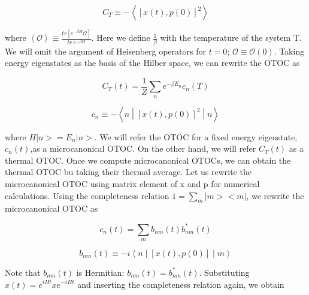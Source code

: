 \documentclass[12pt, letterpaper]{article}
\newcommand*{\1}{\hspace{1pt}}
\begin{document}
        \begin{equation}
            C_{T} \equiv  - \left\langle\left[x(t),p(0)\right]^{2}\right\rangle
        \end{equation}

        where $\left\langle \mathcal{O} \right\rangle \equiv \frac{tr\left[e^{-\beta H }\mathcal{O}\right]}{tr \ e^{-\beta H}}$. Here we define $\frac{1}{\beta}$ with 
        the temperature of the system T. We will omit the argument of Heisenberg operators for $t=0$; $\mathcal{O} \equiv \mathcal{O}(0)$. Taking energy eigenstates as 
        the basis of the Hilber space, we can rewrite the OTOC as 

        \begin{equation}
            C_{T}(t) = \frac{1}{Z} \sum _{n} e^{-\beta E_{n}} c_{n}(T)
        \end{equation}

        \begin{equation}
            c_{n} \equiv -\left\langle n \middle|\left[x(t),p(0)\right]^{2}\middle| n\right\rangle
        \end{equation}

        where $H|n>=E_{n}|n>$. We will refer the OTOC for a fixed energy eigenstate, $c_{n}(t)$,as a microcanonical OTOC. On the other hand, we will refer $C_{T}(t)$ as a
        thermal OTOC. Once we compute microcanonical OTOCs, we can obtain the thermal OTOC bu taking their thermal average. Let us rewrite the microcanonical OTOC using 
        matrix element of x and p for numerical calculations. Using the completeness relation $1 = \sum_{m} |m><m|$, we rewrite the microcanonical OTOC as 

        \begin{equation}
            c_{n}(t) = \sum_{m} b_{nm}(t) b_{nm} ^{*} (t)  
        \end{equation}
        
        \begin{equation}
            b_{nm}(t) \equiv   -i\left\langle n \middle|\left[x(t),p(0)\right]\middle| m\right\rangle
        \end{equation}

        Note that $b_{nm}(t)$ is Hermitian: $b_{nm}(t) = b_{nm} ^{*} (t)$. Substituting $x(t) = e^{iHt}xe^{-iHt}$ and inserting the completeness relation again, we obtain
\end{document}
